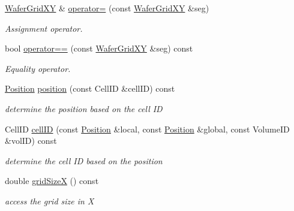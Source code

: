 \begin{DoxyCompactItemize}
\hyperlink{class_d_d4hep_1_1_geometry_1_1_wafer_grid_x_y}{WaferGridXY} \& \hyperlink{class_d_d4hep_1_1_geometry_1_1_wafer_grid_x_y_a3b2e049dcb236d6959273c1b2f779789}{operator=} (const \hyperlink{class_d_d4hep_1_1_geometry_1_1_wafer_grid_x_y}{WaferGridXY} \&seg)
\begin{DoxyCompactList}\small\item\em Assignment operator. \item\end{DoxyCompactList}\item 
bool \hyperlink{class_d_d4hep_1_1_geometry_1_1_wafer_grid_x_y_aab6b6ac50d9ce1f24ef7c6e0cb645ab1}{operator==} (const \hyperlink{class_d_d4hep_1_1_geometry_1_1_wafer_grid_x_y}{WaferGridXY} \&seg) const 
\begin{DoxyCompactList}\small\item\em Equality operator. \item\end{DoxyCompactList}\item 
\hyperlink{namespace_d_d4hep_1_1_geometry_a55083902099d03506c6db01b80404900}{Position} \hyperlink{class_d_d4hep_1_1_geometry_1_1_wafer_grid_x_y_a1ee836fcb785e9058fbafd1b3c29e2b7}{position} (const CellID \&cellID) const 
\begin{DoxyCompactList}\small\item\em determine the position based on the cell ID \item\end{DoxyCompactList}\item 
CellID \hyperlink{class_d_d4hep_1_1_geometry_1_1_wafer_grid_x_y_a77568e8d248dc62dfbe87ca150dcd692}{cellID} (const \hyperlink{namespace_d_d4hep_1_1_geometry_a55083902099d03506c6db01b80404900}{Position} \&local, const \hyperlink{namespace_d_d4hep_1_1_geometry_a55083902099d03506c6db01b80404900}{Position} \&global, const VolumeID \&volID) const 
\begin{DoxyCompactList}\small\item\em determine the cell ID based on the position \item\end{DoxyCompactList}\item 
double \hyperlink{class_d_d4hep_1_1_geometry_1_1_wafer_grid_x_y_a02926ad2edf9677447a54108a95b6187}{gridSizeX} () const 
\begin{DoxyCompactList}\small\item\em access the grid size in X \item\end{DoxyCompactList}\item 

\end{DoxyCompactItemize}
